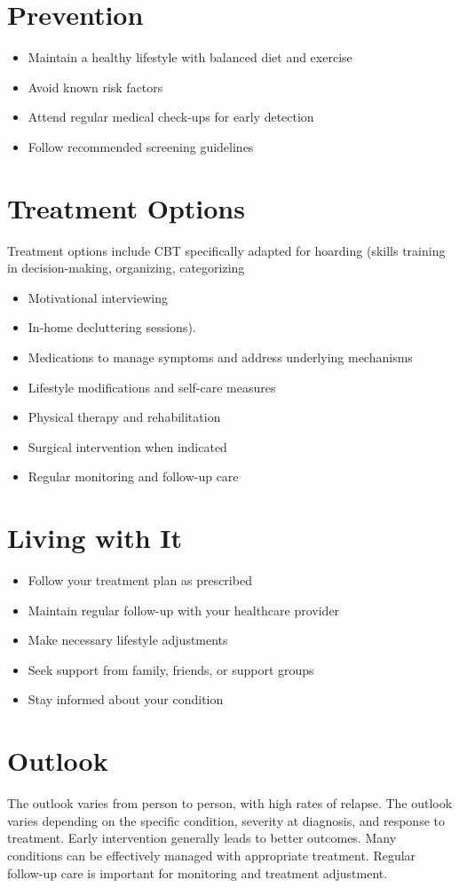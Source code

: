 \section{Prevention}
\begin{itemize}[noitemsep]
  \item Maintain a healthy lifestyle with balanced diet and exercise
  \item Avoid known risk factors
  \item Attend regular medical check-ups for early detection
  \item Follow recommended screening guidelines
\end{itemize}
\section{Treatment Options}
Treatment options include CBT specifically adapted for hoarding (skills training in decision-making, organizing, categorizing

\begin{itemize}[noitemsep]
  \item Motivational interviewing
  \item In-home decluttering sessions).
  \item Medications to manage symptoms and address underlying mechanisms
  \item Lifestyle modifications and self-care measures
  \item Physical therapy and rehabilitation
  \item Surgical intervention when indicated
  \item Regular monitoring and follow-up care
\end{itemize}
\section{Living with It}
\begin{itemize}[noitemsep]
  \item Follow your treatment plan as prescribed
  \item Maintain regular follow-up with your healthcare provider
  \item Make necessary lifestyle adjustments
  \item Seek support from family, friends, or support groups
  \item Stay informed about your condition
\end{itemize}
\section{Outlook}
The outlook varies from person to person, with high rates of relapse. The outlook varies depending on the specific condition, severity at diagnosis, and response to treatment. Early intervention generally leads to better outcomes. Many conditions can be effectively managed with appropriate treatment. Regular follow-up care is important for monitoring and treatment adjustment.
